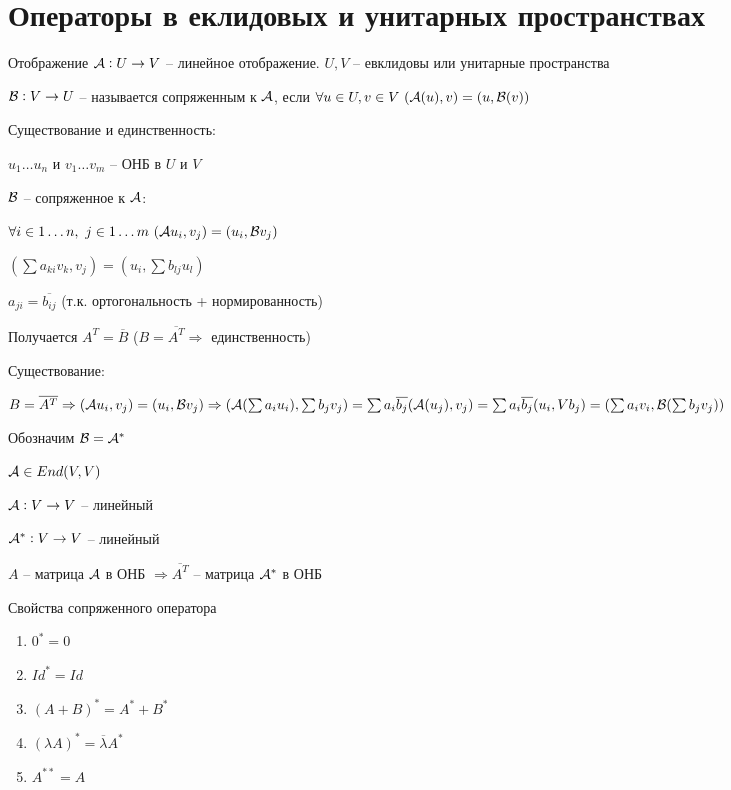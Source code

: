 \documentclass[12pt]{article}
\begin{document}
\section{Операторы в еклидовых и унитарных пространствах}

\begin{defin}{Отображение}
    $\mathcal{A} : U \to V$ -- линейное отображение. $U, V$ -- евклидовы или унитарные пространства

    $\mathcal{B} : V \to U$ -- называется сопряженным к $\mathcal{A}$, если $\forall u \in U, v \in V\ (\mathcal{A}(u), v) = (u, \mathcal{B}(v))$
\end{defin}

Существование и единственность: 

$u_1 \ldots u_n$ и $v_1 \ldots v_m$ -- ОНБ в $U$ и $V$

$\mathcal{B}$ -- сопряженное к $\mathcal{A}$:

$\forall i \in 1 \ldots n,\ j \in 1 \ldots m\ (\mathcal{A} u_i, v_j) = (u_i, \mathcal{B} v_j)$

$(\sum a_{ki}v_k, v_j) = (u_i, \sum b_{lj}u_l)$

$a_{ji} = \overline{b_{ij}}$ (т.к. ортогональность + нормированность)

Получается $A^T = \overline{B}$ ($B = \overline{A^T} \Rightarrow$ единственность)

Существование: 

$B = \overline{A^T} \Rightarrow (\mathcal{A} u_i, v_j) = (u_i, \mathcal{B} v_j) \Rightarrow (\mathcal{A}(\sum a_iu_i), \sum b_jv_j) = \sum a_i\overline{b_j}(\mathcal{A}(u_j), v_j) = \sum a_i\overline{b_j}(u_i, V b_j) = (\sum a_iv_i, \mathcal{B}(\sum b_jv_j))$

Обозначим $\mathcal{B} = \mathcal{A}^*$

$\mathcal{A} \in End(V, V)$

$\mathcal{A} : V \to V$ -- линейный

$\mathcal{A}^* : V \to V$ -- линейный 

$A$ -- матрица $\mathcal{A}$ в ОНБ $\Rightarrow \overline{A^T}$ -- матрица $\mathcal{A}^*$ в ОНБ

\begin{theo}{Свойства сопряженного оператора}
    \begin{enumerate}
        \item $0^* = 0$
        \item $Id^* = Id$
        \item $(A + B)^* = A^* + B^*$
        \item $(\lambda A)^* = \overline{\lambda}A^*$
        \item $A^{**} = A$
    \end{enumerate}
\end{theo}
\end{document}
